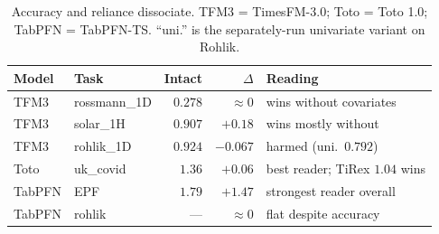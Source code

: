 \begin{table}[t]
\centering
\small
\begin{tabular}{@{}llrrl@{}}
\toprule
Model & Task & Intact & $\Delta$ & Reading \\
\midrule
TFM3 & rossmann\_1D & $0.278$ & $\approx0$ & wins without covariates \\
TFM3 & solar\_1H & $0.907$ & $+0.18$ & wins mostly without \\
TFM3 & rohlik\_1D & $0.924$ & $-0.067$ & harmed (uni.\ $0.792$) \\
Toto & uk\_covid & $1.36$ & $+0.06$ & best reader; TiRex $1.04$ wins \\
TabPFN & EPF & $1.79$ & $+1.47$ & strongest reader overall \\
TabPFN & rohlik & --- & $\approx0$ & flat despite accuracy \\
\bottomrule
\end{tabular}
\caption{Accuracy and reliance dissociate. TFM3 = TimesFM-3.0; Toto = Toto 1.0;
TabPFN = TabPFN-TS. ``uni.'' is the separately-run univariate variant on Rohlik.}
\label{tab:decoupling}
\end{table}
